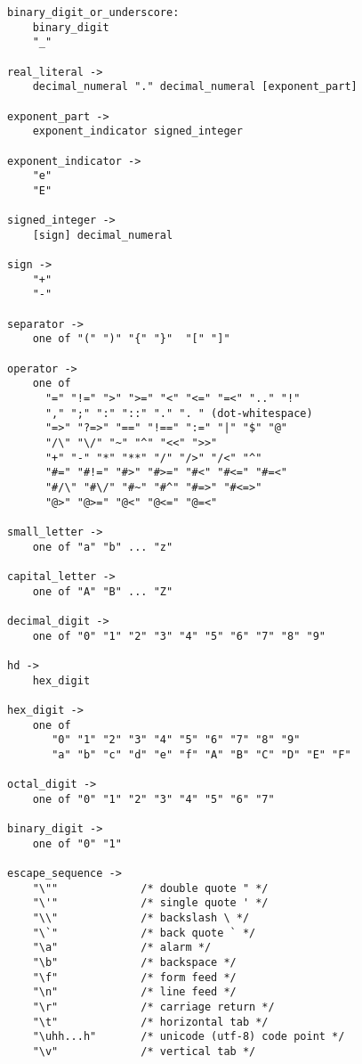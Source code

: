 \begin{scriptsize}
\begin{verbatim}
binary_digit_or_underscore:
    binary_digit
    "_" 

real_literal ->
    decimal_numeral "." decimal_numeral [exponent_part] 

exponent_part ->
    exponent_indicator signed_integer

exponent_indicator ->
    "e" 
    "E"

signed_integer ->
    [sign] decimal_numeral

sign ->
    "+"
    "-"

separator ->
    one of "(" ")" "{" "}"  "[" "]"  

operator ->
    one of
      "=" "!=" ">" ">=" "<" "<=" "=<" ".." "!"
      "," ";" ":" "::" "." ". " (dot-whitespace)
      "=>" "?=>" "==" "!==" ":=" "|" "$" "@"
      "/\" "\/" "~" "^" "<<" ">>"
      "+" "-" "*" "**" "/" "/>" "/<" "^" 
      "#=" "#!=" "#>" "#>=" "#<" "#<=" "#=<"
      "#/\" "#\/" "#~" "#^" "#=>" "#<=>"
      "@>" "@>=" "@<" "@<=" "@=<"

small_letter ->
    one of "a" "b" ... "z"

capital_letter ->
    one of "A" "B" ... "Z"

decimal_digit ->
    one of "0" "1" "2" "3" "4" "5" "6" "7" "8" "9"

hd ->
    hex_digit

hex_digit ->
    one of 
       "0" "1" "2" "3" "4" "5" "6" "7" "8" "9" 
       "a" "b" "c" "d" "e" "f" "A" "B" "C" "D" "E" "F"

octal_digit ->
    one of "0" "1" "2" "3" "4" "5" "6" "7"

binary_digit ->
    one of "0" "1" 

escape_sequence ->
    "\""             /* double quote " */
    "\'"             /* single quote ' */
    "\\"             /* backslash \ */
    "\`"             /* back quote ` */
    "\a"             /* alarm */
    "\b"             /* backspace */
    "\f"             /* form feed */
    "\n"             /* line feed */
    "\r"             /* carriage return */
    "\t"             /* horizontal tab */
    "\uhh...h"       /* unicode (utf-8) code point */
    "\v"             /* vertical tab */
\end{verbatim}
\end{scriptsize}
\ignore{

}
